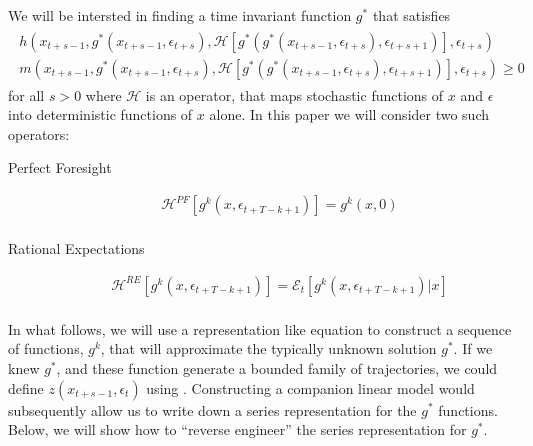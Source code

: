 \documentclass[12pt]{article}
\begin{document}
We will be intersted in
finding a time invariant function $g^\ast$ that satisfies
\begin{gather}
  \begin{split}
h(x_{t+s-1},g^\ast(x_{t+s-1},\epsilon_{t+s}),\mathcal{H}[g^\ast(g^\ast(x_{t+s-1},\epsilon_{t+s}),\epsilon_{t+s+1})],\epsilon_{t+s}) \\
m(x_{t+s-1},g^\ast(x_{t+s-1},\epsilon_{t+s}),\mathcal{H}[g^\ast(g^\ast(x_{t+s-1},\epsilon_{t+s}),\epsilon_{t+s+1})],\epsilon_{t+s}) \ge 0  \label{theProblem}
  \end{split}
 \end{gather}
 for all $s>0$ where $\mathcal{H}$ is an operator, 
  that maps stochastic functions of $x$ and $\epsilon$ into deterministic 
functions of $x$ alone.  In this paper we will consider two such operators:


\begin{description}
\item[Perfect Foresight]
\begin{gather*}
     \mathcal{H}^{PF}[g^{k}(x,\epsilon_{t+T-k+1})]=
g^{k}(x,0)\\
\end{gather*}


\item[Rational Expectations] 
\begin{gather*}
     \mathcal{H}^{RE}[g^{k}(x,\epsilon_{t+T-k+1})]=
\mathcal{E}_t[g^{k}(x,\epsilon_{t+T-k+1})|x]\\
\end{gather*}

 \end{description}












In what follows, we will use a representation like equation  
to construct a sequence of functions, $g^k$, 
that will approximate the typically unknown solution $g^\ast$.
If we knew $g^\ast$, and  these function generate a bounded family of 
trajectories, we could define $z(x_{t+s-1},\epsilon_t)$ using .
Constructing a companion linear model would subsequently allow 
 us to write down a series representation for the $g^\ast$ functions.  Below, we will show how to ``reverse engineer'' the series representation for $g^\ast$.
\end{document}
